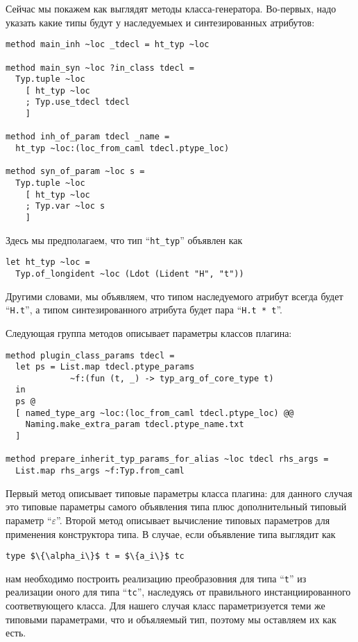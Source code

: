 Сейчас мы покажем как выглядят методы класса-генератора. Во-первых, надо указать какие типы будут у наследуемыех и синтезированных атрибутов:

\begin{lstlisting}
method main_inh ~loc _tdecl = ht_typ ~loc

method main_syn ~loc ?in_class tdecl =
  Typ.tuple ~loc
    [ ht_typ ~loc
    ; Typ.use_tdecl tdecl
    ]

method inh_of_param tdecl _name =
  ht_typ ~loc:(loc_from_caml tdecl.ptype_loc)

method syn_of_param ~loc s =
  Typ.tuple ~loc
    [ ht_typ ~loc
    ; Typ.var ~loc s
    ]
\end{lstlisting}

Здесь мы предполагаем, что тип ``\lstinline{ht_typ}'' объявлен как

\begin{lstlisting}
let ht_typ ~loc =
  Typ.of_longident ~loc (Ldot (Lident "H", "t"))
\end{lstlisting}

Другими словами, мы объявляем, что типом наследуемого атрибут всегда будет 
 ``\lstinline{H.t}'', а типом синтезированного атрибута будет пара
``\lstinline{H.t * t}''.

Следующая группа методов описывает параметры классов плагина:

\begin{lstlisting}
method plugin_class_params tdecl =
  let ps = List.map tdecl.ptype_params 
             ~f:(fun (t, _) -> typ_arg_of_core_type t)
  in
  ps @
  [ named_type_arg ~loc:(loc_from_caml tdecl.ptype_loc) @@
    Naming.make_extra_param tdecl.ptype_name.txt
  ]

method prepare_inherit_typ_params_for_alias ~loc tdecl rhs_args =
  List.map rhs_args ~f:Typ.from_caml
\end{lstlisting}

Первый метод описывает типовые параметры класса плагина: для данного случая это типовые параметры самого объявления типа плюс дополнительный типовый параметр 
``$\varepsilon$''. Второй метод описывает вычисление типовых параметров для применения конструктора типа. В случае, если объявление типа выглядит как 

\begin{lstlisting}
type $\{\alpha_i\}$ t = $\{a_i\}$ tc
\end{lstlisting}

нам необходимо построить реализацию преобразовния для типа ``\lstinline{t}'' 
из реализации оного для типа  ``\lstinline{tc}'', наследуясь от правильного 
инстанциированного соответвующего класса. Для нашего случая класс параметризуется теми же 
типовыми параметрами, что и объяляемый тип, поэтому мы оставляем их как есть.

